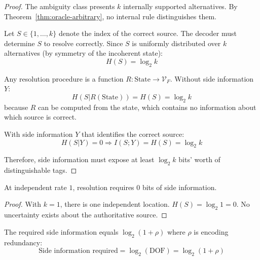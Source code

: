 \begin{proof}
The ambiguity class presents $k$ internally supported alternatives. By Theorem~\ref{thm:oracle-arbitrary}, no internal rule distinguishes them.

Let $S \in \{1, \ldots, k\}$ denote the index of the correct source. The decoder must determine $S$ to resolve correctly. Since $S$ is uniformly distributed over $k$ alternatives (by symmetry of the incoherent state):
\[
H(S) = \log_2 k
\]

Any resolution procedure is a function $R: \text{State} \to \mathcal{V}_F$. Without side information $Y$:
\[
H(S | R(\text{State})) = H(S) = \log_2 k
\]
because $R$ can be computed from the state, which contains no information about which source is correct.

With side information $Y$ that identifies the correct source:
\[
H(S | Y) = 0 \Rightarrow I(S; Y) = H(S) = \log_2 k
\]

Therefore, side information must expose at least $\log_2 k$ bits' worth of distinguishable tags.
\end{proof}

\begin{corollary}\label{cor:dof1-zero-side}
At independent rate $1$, resolution requires 0 bits of side information.
\end{corollary}

\begin{proof}
With $k = 1$, there is one independent location. $H(S) = \log_2 1 = 0$. No uncertainty exists about the authoritative source.
\end{proof}

\begin{corollary}\label{cor:side-info-redundancy}
The required side information equals $\log_2(1 + \rho)$ where $\rho$ is encoding redundancy:
\[
\text{Side information required} = \log_2(\text{DOF}) = \log_2(1 + \rho)
\]
\end{corollary}

